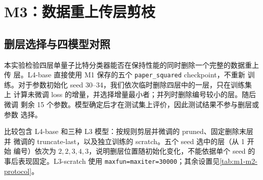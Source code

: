 \section{M3：数据重上传层剪枝}
\label{sec:m3-pruning}

\subsection{删层选择与四模型对照}

本实验检验四层单量子比特分类器能否在保持性能的同时删除一个完整的数据重上传
层。L4-base 直接使用 M1 保存的五个 \texttt{paper\_squared} checkpoint，不重新
训练。对于参数初始化 seed 30--34，我们依次临时删除四层中的一层，只在训练集上
计算未微调 loss 的增量，并选择增量最小者；并列时删除编号较小的层。随后微调
剩余 15 个参数。模型确定后才在测试集上评价，因此测试结果不参与删层或参数
选择。

比较包含 L4-base 和三种 L3 模型：按规则剪层并微调的 pruned、固定删除末层并
微调的 truncate-last，以及独立训练的 scratch。五个 seed 选中的层（从 1 开始
编号）依次为 $2,2,3,4,3$，说明删层位置随初始化变化，不能依据单个 seed 的
事后表现固定。L3-scratch 使用
\texttt{maxfun=maxiter=30000}；其余设置见\cref{tab:m1-m2-protocol}。

\begin{table}[htbp]
    \centering
    \small
    \caption{M3 四模型的五 seed 汇总。$\pm$ 表示跨 seed 的样本标准差；
    L/P 为层数/参数量，depth 为 level 0/3 中位数。端到端
    \texttt{nfev} 对剪层模型计入父 checkpoint 训练。}
    \label{tab:m3-model-summary}
\end{table}

